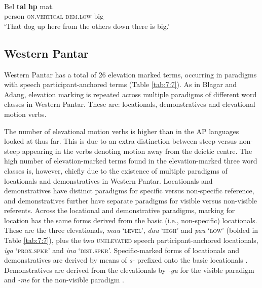     

\ea%
\label{ex:7:29}
 \\
\gll  Bel  \textbf{tal{\textepsilon}} \textbf{h{\textepsilon}p{\textopeno}} mat{\textepsilon}.  \\
   person  \textsc{on.vertical} \textsc{dem.low} big    \\
\glt   `That dog up here from the others down there is big.'
\z



    



\subsection{Western Pantar}
Western Pantar has a total of 26 elevation marked terms, occurring in paradigms with speech participant-anchored terms (Table \ref{tab:7:7}). As in Blagar and Adang, elevation marking is repeated across multiple paradigms of different word classes in Western Pantar. These are: locationals, demonstratives and elevational motion verbs. 

The number of elevational motion verbs is higher than in the AP languages looked at thus far. This is due to an extra distinction between steep versus non-steep appearing in the verbs denoting motion away from the deictic centre. The high number of elevation-marked terms found in the elevation-marked three word classes is, however, chiefly due to the existence of multiple paradigms of locationals and demonstratives in Western Pantar. Locationals and demonstratives have distinct paradigms for specific versus non-specific reference, and demonstratives further have separate paradigms for visible versus non-visible referents. Across the locational and demonstrative paradigms, marking for location has the same forms derived from the basic (i.e., non-specific) locationals. These are the three elevationals, \textit{mau} `\textsc{level',} \textit{dau} `\textsc{high'} and \textit{pau} `\textsc{low'} (bolded in Table \ref{tab:7:7}), plus the two \textsc{unelevated} speech participant-anchored locationals, \textit{iga} `\textsc{prox.spkr'} and \textit{ina} `\textsc{dist.spkr'.} Specific-marked forms of locationals and demonstratives are derived by means of \textit{s-} prefixed onto the basic locationals . Demonstratives are derived from the elevationals by \textit{{}-gu} for the visible paradigm and \textit{{}-me} for the non-visible paradigm .



